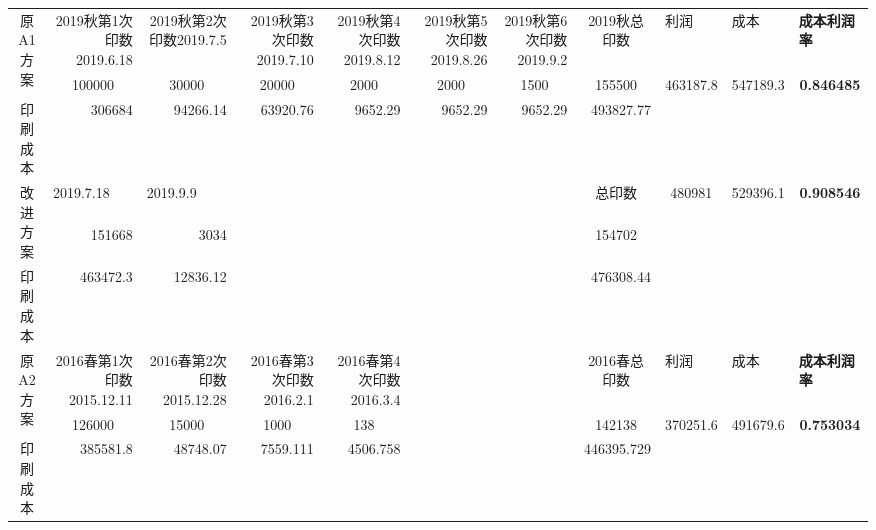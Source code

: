 \documentclass[bwprint]{gmcmthesis}
\begin{document}
\begin{table}[htbp]
  \centering
  \resizebox{0.8\columnwidth}{!}
  {
    \begin{tabular}{crrrrrrrccc}
    \toprule
    \multirow{2}[0]{*}{原A1方案} & \multicolumn{1}{p{4.04em}}{2019秋第1次印数2019.6.18} & \multicolumn{1}{p{4.04em}}{2019秋第2次印数2019.7.5} & \multicolumn{1}{p{4.04em}}{2019秋第3次印数2019.7.10} & \multicolumn{1}{p{4.04em}}{2019秋第4次印数2019.8.12} & \multicolumn{1}{p{4.04em}}{2019秋第5次印数2019.8.26} & \multicolumn{1}{p{4.04em}}{2019秋第6次印数2019.9.2} & \multicolumn{1}{c}{2019秋总印数} & \multicolumn{1}{l}{利润} & \multicolumn{1}{l}{成本} & \multicolumn{1}{l}{\textbf{成本利润率}} \\
          & \multicolumn{1}{c}{100000} & \multicolumn{1}{c}{30000} & \multicolumn{1}{c}{20000} & \multicolumn{1}{c}{2000} & \multicolumn{1}{c}{2000} & \multicolumn{1}{c}{1500} & \multicolumn{1}{c}{155500} & \multirow{2}[0]{*}{463187.8} & \multirow{2}[0]{*}{547189.3} & \multirow{2}[0]{*}{\textbf{0.846485}} \\
    印刷成本  & 306684 & 94266.14 & 63920.76 & 9652.29 & 9652.29 & 9652.29 & 493827.77 &       &       &  \\
    \multirow{2}[0]{*}{改进方案} & \multicolumn{1}{l}{2019.7.18} & \multicolumn{1}{l}{2019.9.9} &       &       &       &       & \multicolumn{1}{c}{总印数} & \multirow{3}[0]{*}{480981} & \multirow{3}[0]{*}{529396.1} & \multirow{3}[0]{*}{\textbf{0.908546}} \\
          & 151668 & 3034  &       &       &       &       & \multicolumn{1}{c}{154702} &       &       &  \\
    印刷成本  & 463472.3 & 12836.12 &       &       &       &       & 476308.44 &       &       &  \\
\midrule
    \multirow{2}[0]{*}{原A2方案} & \multicolumn{1}{p{4.04em}}{2016春第1次印数2015.12.11} & \multicolumn{1}{p{4.04em}}{2016春第2次印数2015.12.28} & \multicolumn{1}{p{4.04em}}{2016春第3次印数   2016.2.1} & \multicolumn{1}{p{4.04em}}{2016春第4次印数   2016.3.4} &       &       & \multicolumn{1}{c}{2016春总印数} & \multicolumn{1}{l}{利润} & \multicolumn{1}{l}{成本} & \multicolumn{1}{l}{\textbf{成本利润率}} \\
          & \multicolumn{1}{c}{126000} & \multicolumn{1}{c}{15000} & \multicolumn{1}{c}{1000} & \multicolumn{1}{c}{138} &       &       & \multicolumn{1}{c}{142138} & \multirow{2}[0]{*}{370251.6} & \multirow{2}[0]{*}{491679.6} & \multirow{2}[0]{*}{\textbf{0.753034}} \\
    印刷成本  & 385581.8 & 48748.07 & 7559.111 & 4506.758 &       &       & 446395.729 &       &       &  \\

\end{tabular}}
\end{table}
\end{document}

